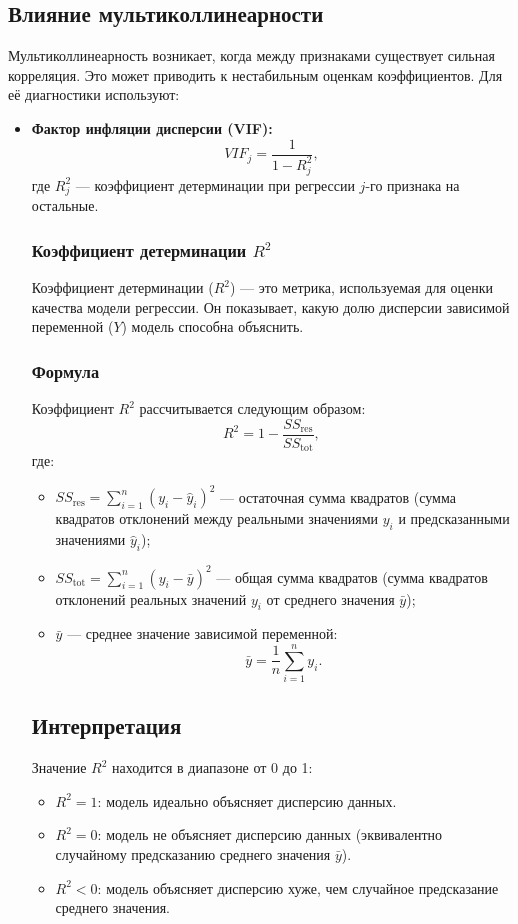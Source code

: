 \subsection*{Влияние мультиколлинеарности}
Мультиколлинеарность возникает, когда между признаками существует сильная корреляция. Это может приводить к нестабильным оценкам коэффициентов. Для её диагностики используют:
\begin{itemize}
    \item \textbf{Фактор инфляции дисперсии (VIF):}
    \[
    VIF_j = \frac{1}{1 - R_j^2},
    \]
    где $R_j^2$ --- коэффициент детерминации при регрессии $j$-го признака на остальные.

    \subsubsection{Коэффициент детерминации \( R^2 \)}

    Коэффициент детерминации (\( R^2 \)) — это метрика, используемая для оценки качества модели регрессии. Он показывает, какую долю дисперсии зависимой переменной (\( Y \)) модель способна объяснить.

    \subsubsection*{Формула}
    Коэффициент \( R^2 \) рассчитывается следующим образом:
    \[
    R^2 = 1 - \frac{SS_{\text{res}}}{SS_{\text{tot}}},
    \]
    где:
    \begin{itemize}
    \item \( SS_{\text{res}} = \sum_{i=1}^n (y_i - \hat{y}_i)^2 \) — остаточная сумма квадратов (сумма квадратов отклонений между реальными значениями \( y_i \) и предсказанными значениями \( \hat{y}_i \));
    \item \( SS_{\text{tot}} = \sum_{i=1}^n (y_i - \bar{y})^2 \) — общая сумма квадратов (сумма квадратов отклонений реальных значений \( y_i \) от среднего значения \( \bar{y} \));
    \item \( \bar{y} \) — среднее значение зависимой переменной:
    \[
    \bar{y} = \frac{1}{n} \sum_{i=1}^n y_i.
    \]
\end{itemize}

\subsection*{Интерпретация}
Значение \( R^2 \) находится в диапазоне от 0 до 1:
\begin{itemize}
    \item \( R^2 = 1 \): модель идеально объясняет дисперсию данных.
    \item \( R^2 = 0 \): модель не объясняет дисперсию данных (эквивалентно случайному предсказанию среднего значения \( \bar{y} \)).
    \item \( R^2 < 0 \): модель объясняет дисперсию хуже, чем случайное предсказание среднего значения.
\end{itemize}


\end{itemize}
